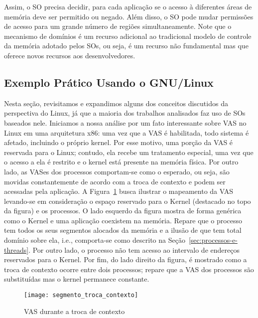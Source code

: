 Assim, o SO precisa decidir, para cada aplicação se o acesso à diferentes áreas
de memória deve ser permitido ou negado.  Além disso, o SO pode mudar
permissões de acesso para um grande número de regiões simultaneamente. Note que o
mecanismo de domínios é um recurso adicional ao tradicional modelo de controle
da memória adotado pelos SOs, ou seja, é um recurso não fundamental mas que
oferece novos recursos aos desenvolvedores.

\subsection{Exemplo Prático Usando o GNU/Linux}
\label{sec:visao_pratica_mem}

Nesta seção, revisitamos e expandimos alguns dos conceitos discutidos da
perspectiva do Linux, já que a maioria dos trabalhos analisados faz uso
de SOs baseados nele. Iniciamos a nossa análise por um fato interessante sobre VAS no Linux em uma
arquitetura x86: uma vez que a VAS é habilitada, todo sistema é afetado,
incluindo o próprio kernel. Por esse motivo, uma porção da VAS é reservada para
o Linux; contudo, ela recebe um tratamento especial, uma vez que o acesso a ela é
restrito e o kernel está presente na memória física. Por outro lado, as VASes dos
processos comportam-se como o esperado, ou seja, são movidas constantemente de
acordo com a troca de contexto e podem ser acessadas pela aplicação. A
Figura~\ref{fig:vas_contexto} busca ilustrar o mapeamento da VAS levando-se em
consideração o espaço reservado para o Kernel (destacado no topo da figura) e os
processos. O lado esquerdo da figura mostra de forma genérica como o Kernel e
uma aplicação coexistem na memória. Repare que o processo tem todos os seus
segmentos alocados da memória e a ilusão de que tem total domínio sobre ela,
i.e., comporta-se como descrito na Seção~\ref{sec:processos-e-threads}. Por
outro lado, o processo não tem acesso ao intervalo de endereços reservados
para o Kernel. Por fim, do lado direito da figura, é mostrado como a troca de
contexto ocorre entre dois processos; repare que a VAS dos processos são
substituídas mas o kernel permanece constante.

\begin{figure}[!h]
  \centering
  \texttt{[image: segmento\_troca\_contexto]}
	\caption[VAS durante a troca de contexto]{VAS durante a troca de contexto~\citep{kernel_manage_mem}}
  \label{fig:vas_contexto}
\end{figure}

